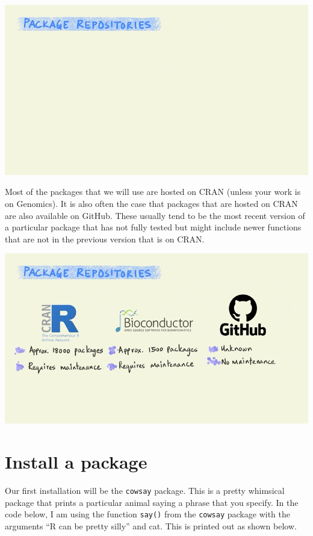 \documentclass[
]{book}
\begin{document}
\includegraphics{assets/packages/gifs/3_repos.gif}

Most of the packages that we will use are hosted on CRAN (unless your work is on Genomics). It is also often the case that packages that are hosted on CRAN are also available on GitHub. These usually tend to be the most recent version of a particular package that has not fully tested but might include newer functions that are not in the previous version that is on CRAN.

\includegraphics{assets/packages/gifs/repo_last.gif}

\hypertarget{install-a-package}{%
\section{Install a package}\label{install-a-package}}

Our first installation will be the \texttt{cowsay} package. This is a pretty whimsical package that prints a particular animal saying a phrase that you specify. In the code below, I am using the function \texttt{say()} from the \texttt{cowsay} package with the arguments ``R can be pretty silly'' and cat. This is printed out as shown below.
\end{document}
